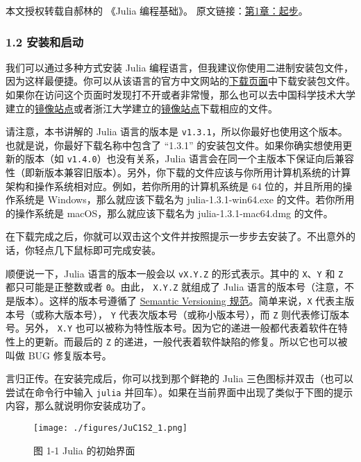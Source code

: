 
本文授权转载自郝林的 《Julia 编程基础》。 原文链接：\href{https://github.com/hyper0x/JuliaBasics/blob/master/book/ch01.md}{第1章：起步}。

\subsubsection{1.2 安装和启动}

我们可以通过多种方式安装 Julia 编程语言，但我建议你使用二进制安装包文件，因为这样最便捷。你可以从该语言的官方中文网站的\href{https://cn.julialang.org/downloads/}{下载页面}中下载安装包文件。如果你在访问这个页面时发现打不开或者非常慢，那么也可以去中国科学技术大学建立的\href{https://mirrors.zju.edu.cn/julia/releases/}{镜像站点}或者浙江大学建立的\href{https://mirrors.ustc.edu.cn/julia/releases/}{镜像站点}下载相应的文件。

请注意，本书讲解的 Julia 语言的版本是 \verb|v1.3.1|，所以你最好也使用这个版本。也就是说，你最好下载名称中包含了 “1.3.1” 的安装包文件。如果你确实想使用更新的版本（如 \verb|v1.4.0|）也没有关系，Julia 语言会在同一个主版本下保证向后兼容性（即新版本兼容旧版本）。另外，你下载的文件应该与你所用计算机系统的计算架构和操作系统相对应。例如，若你所用的计算机系统是 64 位的，并且所用的操作系统是 Windows，那么就应该下载名为 julia-1.3.1-win64.exe 的文件。若你所用的操作系统是 macOS，那么就应该下载名为 julia-1.3.1-mac64.dmg 的文件。

在下载完成之后，你就可以双击这个文件并按照提示一步步去安装了。不出意外的话，你轻点几下鼠标即可完成安装。

顺便说一下，Julia 语言的版本一般会以 \verb|vX.Y.Z| 的形式表示。其中的 \verb|X|、\verb|Y| 和 \verb|Z| 都只可能是正整数或者 \verb|0|。由此， \verb|X.Y.Z| 就组成了 Julia 语言的版本号（注意，不是版本）。这样的版本号遵循了 \href{https://semver.org}{Semantic Versioning 规范}。简单来说，\verb|X| 代表主版本号（或称大版本号）， \verb|Y| 代表次版本号（或称小版本号），而 \verb|Z| 则代表修订版本号。另外， \verb|X.Y| 也可以被称为特性版本号。因为它的递进一般都代表着软件在特性上的更新。而最后的 \verb|Z| 的递进，一般代表着软件缺陷的修复。所以它也可以被叫做 BUG 修复版本号。

言归正传。在安装完成后，你可以找到那个鲜艳的 Julia 三色图标并双击（也可以尝试在命令行中输入 \verb|julia| 并回车）。如果在当前界面中出现了类似于下图的提示内容，那么就说明你安装成功了。

\begin{figure}[ht]
\centering
\texttt{[image: ./figures/JuC1S2\_1.png]}
\caption{图 1-1 Julia 的初始界面} \label{JuC1S2_fig1}
\end{figure}

